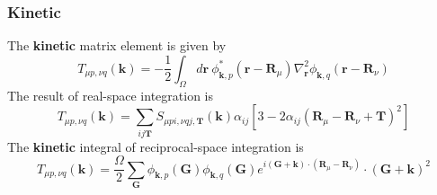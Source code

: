\documentclass{article}
\begin{document}
        \subsubsection{Kinetic}
            The \textbf{kinetic} matrix element is given by
            \begin{equation}
                T_{\mu p,\nu q}(\textbf{k}) = -\frac{1}{2}\int_{\Omega}d\textbf{r}\ \phi_{\textbf{k},p}^*(\textbf{r}-\textbf{R}_{\mu})\nabla_{\textbf{r}}^2\phi_{\textbf{k},q}(\textbf{r}-\textbf{R}_{\nu})
            \end{equation}
            The result of real-space integration is  
            \begin{equation}
                T_{\mu p,\nu q}(\textbf{k}) = \sum_{ij\textbf{T}}S_{\mu pi,\nu qj,\textbf{T}}(\textbf{k})
                \alpha_{ij}\left[3-2\alpha_{ij}(\textbf{R}_{\mu}-\textbf{R}_{\nu}+\textbf{T})^2\right]
            \end{equation}
            The \textbf{kinetic} integral of reciprocal-space integration is
            \begin{equation}
                T_{\mu p,\nu q}(\textbf{k}) = \frac{\Omega}{2}\sum_{\textbf{G}}\phi_{\textbf{k},p}(\textbf{G})\phi_{\textbf{k},q}(\textbf{G})e^{i(\textbf{G}+\textbf{k})\cdot(\textbf{R}_{\mu}-\textbf{R}_{\nu})}\cdot (\textbf{G}+\textbf{k})^2
            \end{equation}
\end{document}
